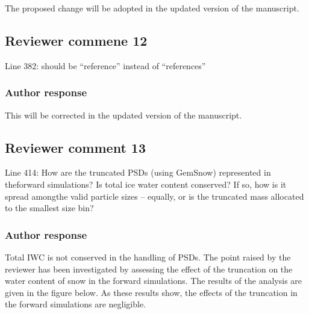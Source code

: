 \documentclass[11pt]{scrartcl}
\providecommand{\DIFadd}[1]{{\protect\textcolor{blue}{\uwave{#1}}}} %
\providecommand{\DIFdel}[1]{{\protect\textcolor{red}{\sout{#1}}}}                      %
\providecommand{\DIFaddbegin}{} %
\providecommand{\DIFaddend}{} %
\providecommand{\DIFdelbegin}{} %
\providecommand{\DIFdelend}{} %
\newenvironment{change}[1][]{%
  \begin{mdframed}[frametitle={Line #1:}]%
}{%
  \end{mdframed}%
}
\begin{document}
The proposed change will be adopted in the updated version of the manuscript.


\subsection*{Reviewer commene 12}

 Line 382: should be “reference” instead of “references”

\subsubsection*{Author response}
This will be corrected in the updated version of the manuscript.


\subsection*{Reviewer comment 13}

Line  414:  How  are  the  truncated  PSDs  (using  GemSnow)  represented  in  theforward simulations? Is total ice water content conserved? If so, how is it spread amongthe valid particle sizes – equally, or is the truncated mass allocated to the smallest size bin?

\subsubsection*{Author response}

Total IWC is not conserved in the handling of PSDs. The point raised by the reviewer has been
investigated by assessing the effect of the truncation on the water content of snow in the
forward simulations. The results of the analysis are given in the figure below. As these results
show, the effects of the truncation in the forward simulations are negligible.
\end{document}
